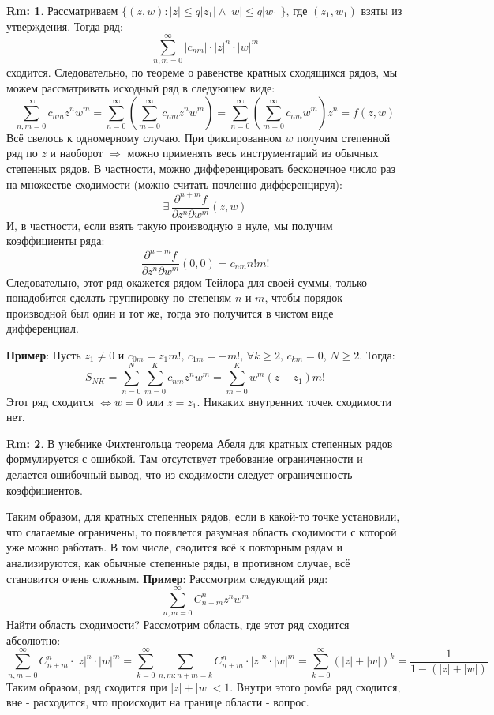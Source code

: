 \documentclass[12pt]{article}
\theoremstyle{definition}
\newtheorem{rem}{Rm:}
\newcommand{\ddsum}[2]{\displaystyle\sum\limits_{#1}^{#2}}
\begin{document}
\begin{rem}
	Рассматриваем $\{(z,w) \colon |z| \leq q|z_1| \wedge |w| \leq q|w_1|\}$, где $(z_1,w_1)$ взяты из утверждения. Тогда ряд:
	$$
		\ddsum{n,m = 0}{\infty}|c_{nm}|{\cdot}|z|^n{\cdot}|w|^m
	$$
	сходится. Следовательно, по теореме о равенстве кратных сходящихся рядов, мы можем рассматривать исходный ряд в следующем виде:
	$$
		\ddsum{n,m = 0}{\infty}c_{nm}z^n w^m = \ddsum{n = 0}{\infty}\left(\ddsum{m = 0}{\infty}c_{nm} z^nw^m\right) = \ddsum{n = 0}{\infty}\left(\ddsum{m = 0}{\infty}c_{nm} w^m\right)z^n = f(z,w)
	$$
	Всё свелось к одномерному случаю. При фиксированном $w$ получим степенной ряд по $z$ и наоборот $\Rightarrow$ можно применять весь инструментарий из обычных степенных рядов. В частности, можно дифференцировать бесконечное число раз на множестве сходимости (можно считать почленно дифференцируя):
	$$
		\exists \, \dfrac{\partial^{n + m}f}{\partial z^n \partial w^m}(z,w)
	$$
	И, в частности, если взять такую производную в нуле, мы получим коэффициенты ряда:
	$$
		\dfrac{\partial^{n + m}f}{\partial z^n \partial w^m}(0,0) = c_{nm} n! m!
	$$
	Следовательно, этот ряд окажется рядом Тейлора для своей суммы, только понадобится сделать группировку по степеням $n$ и $m$, чтобы порядок производной был один и тот же, тогда это получится в чистом виде дифференциал.
\end{rem}

\textbf{Пример}: Пусть $z_1 \neq 0$ и $c_{0m} = z_1 m!, \, c_{1m} = -m!, \, \forall k \geq 2,\, c_{km} = 0$, $N \geq 2$. Тогда:
$$
	S_{NK} = \ddsum{n = 0}{N}\ddsum{m = 0}{K}c_{nm}z^n w^m = \ddsum{m = 0}{K}w^m \left(z - z_1\right)m!
$$
Этот ряд сходится $\Leftrightarrow w = 0$ или $z = z_1$. Никаких внутренних точек сходимости нет.
\begin{rem}
	В учебнике Фихтенгольца теорема Абеля для кратных степенных рядов формулируется с ошибкой. Там отсутствует требование ограниченности и делается ошибочный вывод, что из сходимости следует ограниченность коэффициентов.
\end{rem}
Таким образом, для кратных степенных рядов, если в какой-то точке установили, что слагаемые ограничены, то появлется разумная область сходимости с которой уже можно работать. В том числе, сводится всё к повторным рядам и анализируются, как обычные степенные ряды, в противном случае, всё становится очень сложным.
\newpage
\textbf{Пример}: Рассмотрим следующий ряд:
$$
	\ddsum{n,m = 0}{\infty}C_{n + m}^n z^n w^m
$$ 
Найти область сходимости? Рассмотрим область, где этот ряд сходится абсолютно:
$$
	\ddsum{n,m = 0}{\infty}C_{n + m}^n {\cdot}|z|^n{\cdot} |w|^m = \ddsum{k = 0}{\infty}\ddsum{n,m \colon n + m = k}{}C_{n + m}^n {\cdot}|z|^n{\cdot}|w|^m = \ddsum{k = 0}{\infty}\left(|z| + |w|\right)^k = \dfrac{1}{1 - (|z| + |w|)}
$$
Таким образом, ряд сходится при $|z| + |w| < 1$. Внутри этого ромба ряд сходится, вне - расходится, что происходит на границе области - вопрос.
\end{document}
